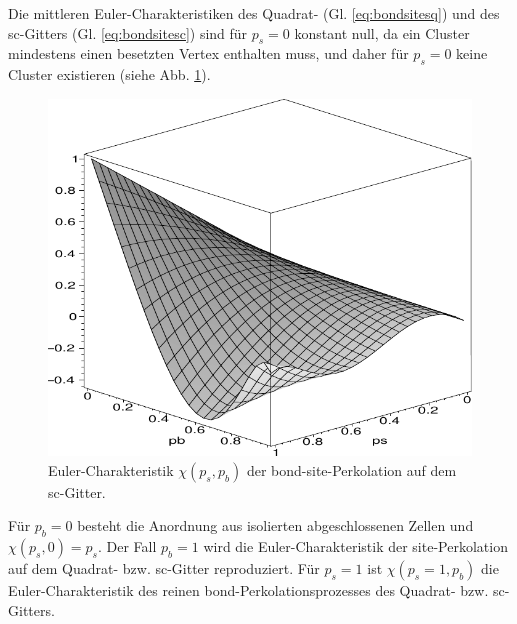Die mittleren Euler-Charakteristiken des Quadrat- (Gl. \ref{eq:bondsitesq}) und des sc-Gitters (Gl. \ref{eq:bondsitesc}) sind f\"ur $p_s=0$ konstant null, da ein Cluster mindestens einen besetzten Vertex enthalten muss, und daher f\"ur $p_s=0$ keine Cluster existieren (siehe Abb. \ref{fig:chi-bond-site}). 
\begin{figure}[bt]
  \centering
  \includegraphics{./Mixed-figs/chibondsiteplot}
  \caption{Euler-Charakteristik $\chi(p_s,p_b)$ der bond-site-Perkolation auf dem sc-Gitter.}
  \label{fig:chi-bond-site}
\end{figure}
F\"ur $p_b=0$ besteht die Anordnung aus isolierten abgeschlossenen Zellen und $\chi(p_s,0)=p_s$. Der Fall $p_b=1$ wird die Euler-Charakteristik der site-Perkolation auf dem Quadrat- bzw. sc-Gitter reproduziert. F\"ur $p_s=1$ ist $\chi(p_s=1,p_b)$ die Euler-Charakteristik des reinen bond-Perkolationsprozesses des Quadrat- bzw. sc-Gitters. 

